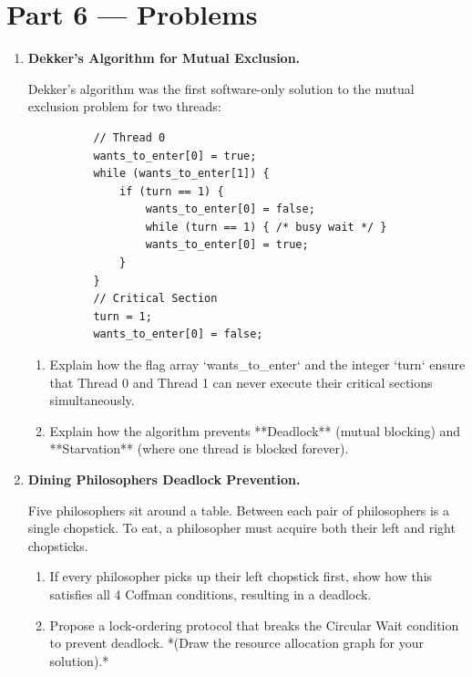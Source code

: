 \documentclass[12pt, a4paper]{book}
\begin{document}
\newpage

\section{Part 6 --- Problems}

\begin{problembox}
\begin{enumerate}[label=\textbf{P\arabic*.}]
  \item \textbf{Dekker's Algorithm for Mutual Exclusion.}
  
        Dekker's algorithm was the first software-only solution to the mutual exclusion problem for two threads:
        \begin{verbatim}
          // Thread 0
          wants_to_enter[0] = true;
          while (wants_to_enter[1]) {
              if (turn == 1) {
                  wants_to_enter[0] = false;
                  while (turn == 1) { /* busy wait */ }
                  wants_to_enter[0] = true;
              }
          }
          // Critical Section
          turn = 1;
          wants_to_enter[0] = false;
        \end{verbatim}
        \begin{enumerate}[label=(\alph*)]
          \item Explain how the flag array `wants_to_enter` and the integer `turn` ensure that Thread 0 and Thread 1 can never execute their critical sections simultaneously.
          \item Explain how the algorithm prevents **Deadlock** (mutual blocking) and **Starvation** (where one thread is blocked forever).
        \end{enumerate}

  \item \textbf{Dining Philosophers Deadlock Prevention.}
  
        Five philosophers sit around a table. Between each pair of philosophers is a single chopstick.
        To eat, a philosopher must acquire both their left and right chopsticks.
        \begin{enumerate}[label=(\alph*)]
          \item If every philosopher picks up their left chopstick first, show how this satisfies all 4 Coffman conditions, resulting in a deadlock.
          \item Propose a lock-ordering protocol that breaks the Circular Wait condition to prevent deadlock.
                *(Draw the resource allocation graph for your solution).*
        \end{enumerate}
\end{enumerate}
\end{problembox}
\end{document}
